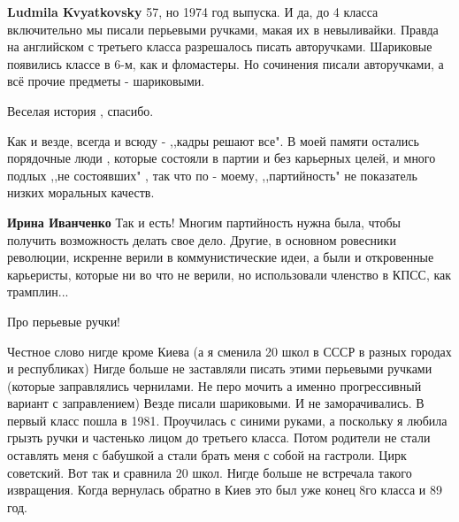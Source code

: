 \begin{itemize}
\begin{itemize}
\textbf{Ludmila Kvyatkovsky} 57, но 1974 год выпуска. И да, до 4 класса
включительно мы писали перьевыми ручками, макая их в невыливайки. Правда на
английском с третьего класса разрешалось писать авторучками. Шариковые
появились классе в 6-м, как и фломастеры. Но сочинения писали авторучками, а
всё прочие предметы - шариковыми.
\end{itemize}

 

Веселая история , спасибо.

Как и везде, всегда и всюду - ,,кадры решают все". В моей памяти остались
порядочные люди , которые состояли в партии и без карьерных целей, и много
подлых ,,не состоявших" , так что по - моему, ,,партийность" не показатель
низких моральных качеств.

\begin{itemize}
 
\textbf{Ирина Иванченко} Так и есть! Многим партийность нужна была, чтобы
получить возможность делать свое дело. Другие, в основном ровесники революции,
искренне верили в коммунистические идеи, а были и откровенные карьеристы,
которые ни во что не верили, но использовали членство в КПСС, как трамплин...
\end{itemize}



Про перьевые ручки! 

Честное слово нигде кроме Киева (а я сменила 20 школ в СССР в разных городах и
республиках) Нигде больше не заставляли писать этими перьевыми ручками (которые
заправлялись чернилами. Не перо мочить а именно прогрессивный вариант с
заправлением) Везде писали шариковыми. И не заморачивались. В первый класс
пошла в 1981. Проучилась с синими руками, а поскольку я любила грызть ручки и
частенько лицом до третьего класса. Потом родители не стали оставлять меня с
бабушкой а стали брать меня с собой на гастроли. Цирк советский. Вот так и
сравнила 20 школ. Нигде больше не встречала такого извращения. Когда вернулась
обратно в Киев это был уже конец 8го класса и 89 год. 


\end{itemize}
